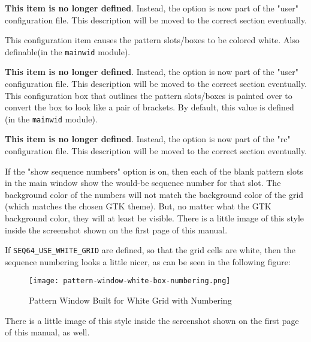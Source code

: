         \textbf{This item is no longer defined}.
        Instead, the option is now part of the "user" configuration file.  This
        description will be moved to the correct section eventually.

        This configuration item causes the pattern slots/boxes to be colored
        white.  Also definable(in the \texttt{mainwid} module).

        \textbf{This item is no longer defined}.
        Instead, the option is now part of the "user" configuration file.  This
        description will be moved to the correct section eventually.
        This configuration box that outlines the pattern slots/boxes is
        painted over to convert the box to look like a pair of brackets.
        By default, this value is defined (in the \texttt{mainwid} module).

        \textbf{This item is no longer defined}.
        Instead, the option is now part of the "rc" configuration file.  This
        description will be moved to the correct section eventually.

        If the "show sequence numbers" option is on, then each
        of the blank pattern slots in the main window show the would-be
        sequence number for that slot.  The background color of the numbers
        will not match the background color of the grid (which matches the
        chosen GTK theme).  But, no matter what the GTK background color, they
        will at least be visible.  There is a little image of this style inside
        the screenshot shown on the first page of this manual.

        If \texttt{SEQ64\_USE\_WHITE\_GRID}
        are defined, so that the grid cells are white, then the sequence
        numbering looks a little nicer, as can be seen in the following
        figure:

\begin{figure}[H]
   \centering 
   \texttt{[image: pattern-window-white-box-numbering.png]}
   \caption{Pattern Window Built for White Grid with Numbering}
   \label{fig:seq64_build_white_box_numbering}
\end{figure}

        There is a little image of this style inside the screenshot shown on
        the first page of this manual, as well.

